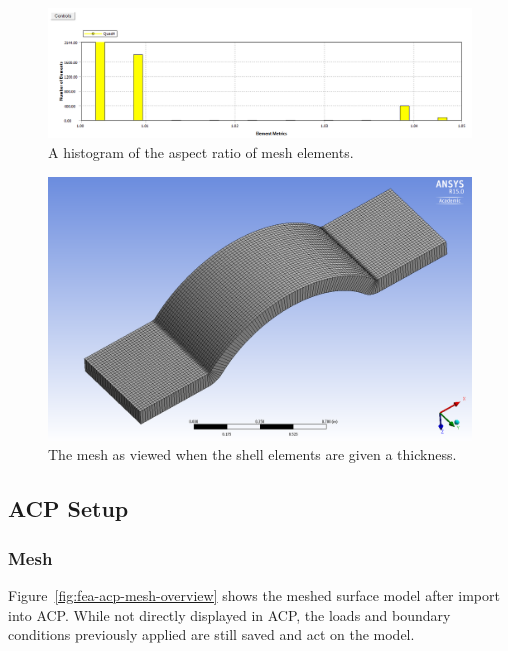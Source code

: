 \begin{figure}[htp]
\centering
\includegraphics[width=1\textwidth]{./figures/fea/fea-mechanical-mesh-metrics-histogram}
\caption{A histogram of the aspect ratio of mesh elements.}
\label{fig:fea-mechanical-mesh-metrics-histogram}
\end{figure}

\begin{figure}[htp]
\centering
\includegraphics[width=1\textwidth]{./figures/fea/fea-mechanical-mesh-thick-shell}
\caption{The mesh as viewed when the shell elements are given a thickness.}
\label{fig:fea-mechanical-mesh-thick-shell}
\end{figure}


\clearpage

\subsection{ACP Setup}

\subsubsection{Mesh}

\indent

Figure~\ref{fig:fea-acp-mesh-overview} shows the meshed surface model after import into ACP. While not directly displayed in ACP, the loads and boundary conditions previously applied are still saved and act on the model.\\

